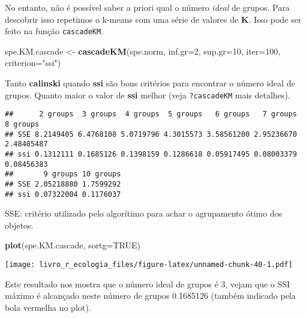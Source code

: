 \documentclass[
]{book}
\newenvironment{Shaded}{\begin{snugshade}}{\end{snugshade}}
\newcommand{\CommentTok}[1]{\textcolor[rgb]{0.56,0.35,0.01}{\textit{#1}}}
\newcommand{\DataTypeTok}[1]{\textcolor[rgb]{0.13,0.29,0.53}{#1}}
\newcommand{\DecValTok}[1]{\textcolor[rgb]{0.00,0.00,0.81}{#1}}
\newcommand{\KeywordTok}[1]{\textcolor[rgb]{0.13,0.29,0.53}{\textbf{#1}}}
\newcommand{\NormalTok}[1]{#1}
\newcommand{\OperatorTok}[1]{\textcolor[rgb]{0.81,0.36,0.00}{\textbf{#1}}}
\newcommand{\OtherTok}[1]{\textcolor[rgb]{0.56,0.35,0.01}{#1}}
\newcommand{\StringTok}[1]{\textcolor[rgb]{0.31,0.60,0.02}{#1}}
\begin{document}
No entanto, não é possível saber a priori qual o número \emph{ideal} de grupos. Para descobrir isso repetimos o k-means com uma série de valores de \textbf{K}. Isso pode ser feito na função \texttt{cascadeKM}.

\begin{Shaded}
\begin{Highlighting}[]
\NormalTok{spe.KM.cascade <-}\StringTok{ }\KeywordTok{cascadeKM}\NormalTok{(spe.norm, }\DataTypeTok{inf.gr=}\DecValTok{2}\NormalTok{, }\DataTypeTok{sup.gr=}\DecValTok{10}\NormalTok{, }\DataTypeTok{iter=}\DecValTok{100}\NormalTok{, }\DataTypeTok{criterion=}\StringTok{"ssi"}\NormalTok{) }
\end{Highlighting}
\end{Shaded}

Tanto \textbf{calinski} quando \textbf{ssi} são bons critérios para encontrar o número ideal de grupos. Quanto maior o valor de \textbf{ssi} melhor (veja \texttt{?cascadeKM} mais detalhes).

\begin{Shaded}
\end{Shaded}

\begin{verbatim}
##      2 groups  3 groups  4 groups  5 groups   6 groups   7 groups   8 groups
## SSE 8.2149405 6.4768108 5.0719796 4.3015573 3.58561200 2.95236670 2.48405487
## ssi 0.1312111 0.1685126 0.1398159 0.1286618 0.05917495 0.08003379 0.08456383
##       9 groups 10 groups
## SSE 2.05218880 1.7599292
## ssi 0.07322004 0.1176037
\end{verbatim}

SSE: critério utilizado pelo algorítimo para achar o agrupamento ótimo dos objetos.

\begin{Shaded}
\begin{Highlighting}[]
\KeywordTok{plot}\NormalTok{(spe.KM.cascade, }\DataTypeTok{sortg=}\OtherTok{TRUE}\NormalTok{)}
\end{Highlighting}
\end{Shaded}

\texttt{[image: livro\_r\_ecologia\_files/figure-latex/unnamed-chunk-40-1.pdf]}

Este resultado nos mostra que o número ideal de grupos é 3, vejam que o SSI máximo é alcançado neste número de grupos 0.1685126 (também indicado pela bola vermelha no plot).
\end{document}
